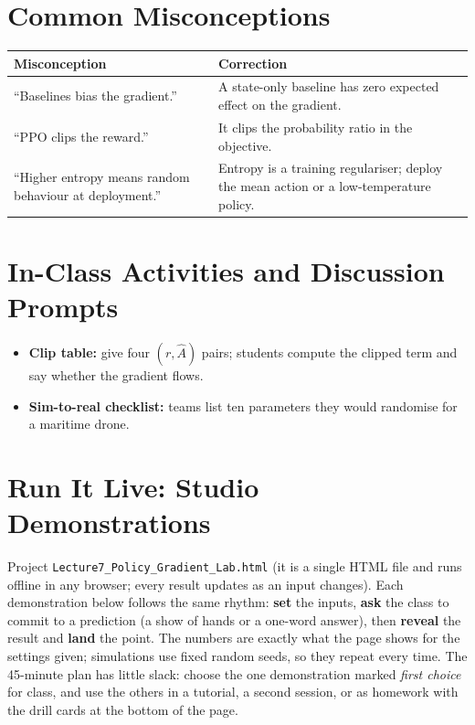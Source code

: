 \documentclass[11pt]{article}
\begin{document}
\section{Common Misconceptions}\begin{center}\small\renewcommand{\arraystretch}{1.35}\begin{tabularx}{\textwidth}{@{}>{\raggedright\arraybackslash}X >{\raggedright\arraybackslash}X@{}}\toprule\textbf{Misconception} & \textbf{Correction}\\\midrule``Baselines bias the gradient.'' & A state-only baseline has zero expected effect on the gradient.\\
``PPO clips the reward.'' & It clips the probability ratio in the objective.\\
``Higher entropy means random behaviour at deployment.'' & Entropy is a training regulariser; deploy the mean action or a low-temperature policy.\\\bottomrule\end{tabularx}\end{center}

\section{In-Class Activities and Discussion Prompts}\label{sec:act}\begin{itemize}\item \textbf{Clip table:} give four $(r,\hat A)$ pairs; students compute the clipped term and say whether the gradient flows.\item \textbf{Sim-to-real checklist:} teams list ten parameters they would randomise for a maritime drone.\end{itemize}

\section{Run It Live: Studio Demonstrations}\label{sec:live}

Project \texttt{Lecture7\_Policy\_Gradient\_Lab.html} (it is a single HTML file and runs offline in any browser; every result updates as an input changes). Each demonstration below follows the same rhythm: \textbf{set} the inputs, \textbf{ask} the class to commit to a prediction (a show of hands or a one-word answer), then \textbf{reveal} the result and \textbf{land} the point. The numbers are exactly what the page shows for the settings given; simulations use fixed random seeds, so they repeat every time. The 45-minute plan has little slack: choose the one demonstration marked \emph{first choice} for class, and use the others in a tutorial, a second session, or as homework with the drill cards at the bottom of the page.
\end{document}
